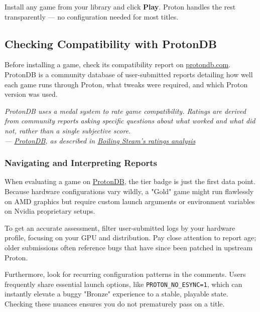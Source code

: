 \documentclass{article}
\begin{document}
\noindent Install any game from your library and click \textbf{Play}. Proton
handles the rest transparently --- no configuration needed for most titles.

\subsection{Checking Compatibility with ProtonDB}

Before installing a game, check its compatibility report on
\href{https://www.protondb.com}{protondb.com}. ProtonDB is a community database
of user-submitted reports detailing how well each game runs through Proton,
what tweaks were required, and which Proton version was used.

\begin{mdframed}[linewidth=1.5pt, linecolor=black!50, topline=true, bottomline=true,
	leftline=false, rightline=false, backgroundcolor=black!3]
	\small\itshape
	ProtonDB uses a medal system to rate game compatibility. Ratings are derived
	from community reports asking specific questions about what worked and what
	did not, rather than a single subjective score.\\[4pt]
	\normalfont\small ---
	\href{https://www.protondb.com}{ProtonDB}, as described in
	\href{https://boilingsteam.com/protondb-ratings-revised/}{Boiling Steam's
		ratings analysis}
\end{mdframed}

\subsubsection{Navigating and Interpreting Reports}

When evaluating a game on \href{https://protondb.com}{ProtonDB}, the tier badge 
is just the first data point. Because hardware configurations vary wildly, a 
"Gold" game might run flawlessly on AMD graphics but require custom launch 
arguments or environment variables on Nvidia proprietary setups.

To get an accurate assessment, filter user-submitted logs by your hardware profile, 
focusing on your GPU and distribution. Pay close attention to report age; older 
submissions often reference bugs that have since been patched in upstream Proton.

Furthermore, look for recurring configuration patterns in the comments. Users 
frequently share essential launch options, like \texttt{PROTON\_NO\_ESYNC=1}, 
which can instantly elevate a buggy "Bronze" experience to a stable, playable state. 
Checking these nuances ensures you do not prematurely pass on a title.
\end{document}
